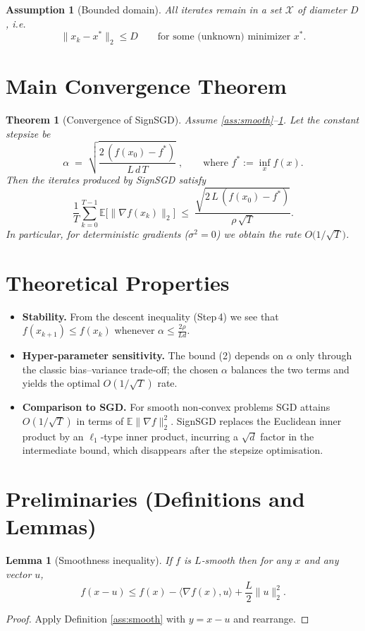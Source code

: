 \documentclass{article}
\newtheorem{theorem}{Theorem}
\newtheorem{lemma}{Lemma}
\newtheorem{assumption}{Assumption}
\newcommand{\E}{\mathbb{E}}
\begin{document}
\begin{assumption}[Bounded domain]\label{ass:bounded}
All iterates remain in a set $\mathcal X$ of diameter $D$, i.e.
\[
\|x_k-x^{*}\|_{2}\le D\qquad\text{for some (unknown) minimizer }x^{*}.
\]
\end{assumption}

\section*{Main Convergence Theorem}
\begin{theorem}[Convergence of SignSGD]\label{thm:main}
Assume \ref{ass:smooth}–\ref{ass:bounded}. Let the constant stepsize be
\[
\alpha \;=\; \sqrt{\frac{2\,(f(x_0)-f^{*})}{L\,d\,T}}\;,
\qquad\text{where }f^{*}:=\inf_{x}f(x).
\]
Then the iterates produced by SignSGD satisfy
\[
\frac{1}{T}\sum_{k=0}^{T-1}\E\!\bigl[\|\nabla f(x_k)\|_{2}\bigr]
\;\le\;
\frac{\sqrt{2\,L\,(f(x_0)-f^{*})}}{\rho\,\sqrt{T}} .
\tag{2}
\]
In particular, for deterministic gradients ($\sigma^{2}=0$) we obtain the
rate $O\!\bigl(1/\sqrt{T}\bigr)$.
\end{theorem}

\section*{Theoretical Properties}
\begin{itemize}
\item \textbf{Stability.}  From the descent inequality (Step 4) we see that
$f(x_{k+1})\le f(x_k)$ whenever $\alpha\le\frac{2\rho}{L d}$.
\item \textbf{Hyper‑parameter sensitivity.}  The bound (2) depends on $\alpha$
only through the classic bias–variance trade‑off; the chosen $\alpha$
balances the two terms and yields the optimal $O(1/\sqrt{T})$ rate.
\item \textbf{Comparison to SGD.}  For smooth non‑convex problems SGD attains
$O(1/\sqrt{T})$ in terms of $\E\|\nabla f\|_{2}^{2}$.  SignSGD replaces the
Euclidean inner product by an $\ell_{1}$‑type inner product, incurring a
$\sqrt{d}$ factor in the intermediate bound, which disappears after the
stepsize optimisation.
\end{itemize}

\section*{Preliminaries (Definitions and Lemmas)}
\begin{lemma}[Smoothness inequality]\label{lem:smooth}
If $f$ is $L$‑smooth then for any $x$ and any vector $u$,
\[
f(x-u)\le f(x)-\langle\nabla f(x),u\rangle+\frac{L}{2}\|u\|_{2}^{2}.
\]
\end{lemma}
\begin{proof}
Apply Definition \ref{ass:smooth} with $y=x-u$ and rearrange.
\end{proof}
\end{document}
